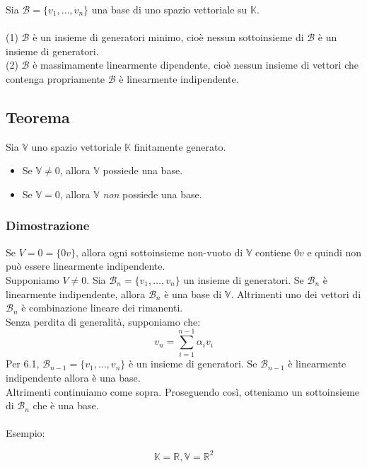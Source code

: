 \documentclass[12pt]{article}
\begin{document}
Sia $\mathcal{B} = \{v_1, \dots, v_n\}$ una base di uno spazio vettoriale su $\mathbb{K}.$\\\\
(1) $\mathcal{B}$ è un insieme di generatori minimo, cioè nessun sottoinsieme di $\mathcal{B}$ è un insieme di generatori.
\\
(2) $\mathcal{B}$ è massimamente linearmente dipendente, cioè nessun insieme di vettori che contenga propriamente $\mathcal{B}$ è linearmente indipendente.

\subsection{Teorema}

Sia $\mathbb{V}$ uno spazio vettoriale $\mathbb{K}$ finitamente generato. \begin{itemize}\item Se $\mathbb{V} \neq 0$, allora $\mathbb{V}$ possiede una base.
\item Se $\mathbb{V} = 0$, allora $\mathbb{V}$ \textit{non} possiede una base.
\end{itemize}

\subsubsection{Dimostrazione}

Se $V = 0 = \{0v\}$, allora ogni sottoinsieme non-vuoto di $\mathbb{V}$ contiene $0v$ e quindi non può essere linearmente indipendente.\\
Supponiamo $V \neq 0$.
Sia $\mathcal{B}_n = \{v_1, \dots, v_n\}$ un insieme di generatori. Se $\mathcal{B}_n$ è linearmente indipendente, allora $\mathcal{B}_n$ è una base di $\mathbb{V}$.
Altrimenti uno dei vettori di $\mathcal{B}_n$ è combinazione lineare dei rimanenti. \\
Senza perdita di generalità, supponiamo che: \[v_n = \sum^{n-1}_{i = 1} \alpha_iv_i\]
Per 6.1, $\mathcal{B}_{n-1} = \{v_1, \dots, v_n\}$ è un insieme di generatori. Se $\mathcal{B}_{n-1}$ è linearmente indipendente allora è una base.\\
Altrimenti continuiamo come sopra. Proseguendo così, otteniamo un sottoinsieme di $\mathcal{B}_n$ che è una base.
\\\\
Esempio:

\[\mathbb{K} = \mathbb{R}, \mathbb{V} = \mathbb{R}^2\]
\end{document}
